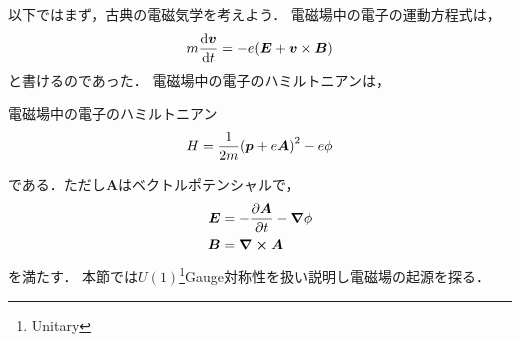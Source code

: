 \documentclass{report}
\begin{document}
  以下ではまず，古典の電磁気学を考えよう．
  電磁場中の電子の運動方程式は，
  \begin{align}
    m\dv{\bm{v}}{t} = -e\qty(\bm{E} + \bm{v}\times\bm{B})
  \end{align}
  と書けるのであった．
  電磁場中の電子のハミルトニアンは，
  \begin{itembox}[l]{電磁場中の電子のハミルトニアン}
    \begin{align}
      H = \frac{1}{2m}\qty(\bm{p} + e\bm{A})^2 - e\phi\label{hamiltonian-in-electro-magnetic-field-cm}
    \end{align}
  \end{itembox}
  である．ただし$\bm{A}$はベクトルポテンシャルで，
  \begin{align}
    \bm{E} &= -\pdv{\bm{A}}{t} - \grad\phi \\ 
    \bm{B} &= \curl\bm{A}
  \end{align}
  を満たす．
  本節では$U(1)$\footnote{Unitary}Gauge対称性を扱い説明し電磁場の起源を探る．
\end{document}
